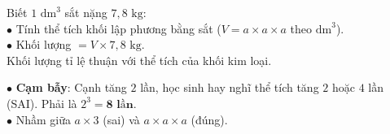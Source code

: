 \documentclass[14pt,a4paper,oneside]{extbook}
\begin{document}
\vspace{3mm}

\noindent
\begin{minipage}[t]{0.54\textwidth}
  \begin{tcolorbox}[
    enhanced,
    title={\footnotesize\bfseries\color{white}\faBalanceScale\ Tính khối lượng kim loại},
    colback=green!3!white,
    colframe=green!60!black,
    arc=2.5mm, boxrule=0.8pt, top=1.8mm, bottom=1.8mm, left=2.2mm, right=2.2mm
  ]
    \footnotesize
    Biết $1\text{ dm}^3$ sắt nặng $7,8\text{ kg}$:\\
    $\bullet$ Tính thể tích khối lập phương bằng sắt ($V = a \times a \times a$ theo $\text{dm}^3$).\\
    $\bullet$ Khối lượng $= V \times 7,8\text{ kg}$.\\
    Khối lượng tỉ lệ thuận với thể tích của khối kim loại.
  \end{tcolorbox}
\end{minipage}%
\hfill
\begin{minipage}[t]{0.44\textwidth}
  \begin{tcolorbox}[
    enhanced,
    title={\footnotesize\bfseries\color{white}\faExclamationTriangle\ Mẹo tránh bẫy trắc nghiệm},
    colback=red!2!white,
    colframe=red!70!black,
    arc=2.5mm, boxrule=0.8pt, top=1.8mm, bottom=1.8mm, left=2.2mm, right=2.2mm
  ]
    \footnotesize
    $\bullet$ \textbf{Cạm bẫy}: Cạnh tăng $2$ lần, học sinh hay nghĩ thể tích tăng $2$ hoặc $4$ lần (SAI). Phải là $2^3 = \mathbf{8\text{ lần}}$.\\
    $\bullet$ Nhầm giữa $a \times 3$ (sai) và $a \times a \times a$ (đúng).
  \end{tcolorbox}
\end{minipage}
\end{document}
